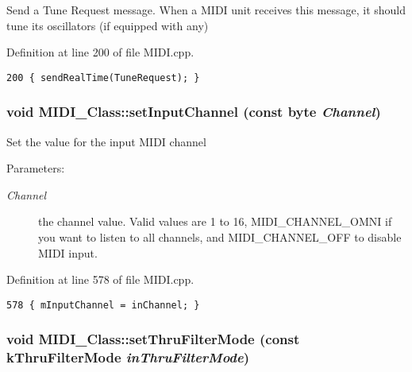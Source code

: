 Send a Tune Request message. When a MIDI unit receives this message, it should tune its oscillators (if equipped with any) 

Definition at line 200 of file MIDI.cpp.

\begin{Code}\begin{verbatim}200 { sendRealTime(TuneRequest); }
\end{verbatim}
\end{Code}


\hypertarget{class_m_i_d_i___class_35a66d47ba598c7ebbee7fbf654dafe8}{
\subsubsection[{setInputChannel}]{\setlength{\rightskip}{0pt plus 5cm}void MIDI\_\-Class::setInputChannel (const {\bf byte} {\em Channel})}}
\label{class_m_i_d_i___class_35a66d47ba598c7ebbee7fbf654dafe8}


Set the value for the input MIDI channel \begin{Desc}
\item[Parameters:]
\begin{description}
\item[{\em Channel}]the channel value. Valid values are 1 to 16, MIDI\_\-CHANNEL\_\-OMNI if you want to listen to all channels, and MIDI\_\-CHANNEL\_\-OFF to disable MIDI input. \end{description}
\end{Desc}


Definition at line 578 of file MIDI.cpp.

\begin{Code}\begin{verbatim}578 { mInputChannel = inChannel; }
\end{verbatim}
\end{Code}


\hypertarget{class_m_i_d_i___class_33d450180a10a36bef08e68015c4d922}{
\subsubsection[{setThruFilterMode}]{\setlength{\rightskip}{0pt plus 5cm}void MIDI\_\-Class::setThruFilterMode (const {\bf kThruFilterMode} {\em inThruFilterMode})}}
\label{class_m_i_d_i___class_33d450180a10a36bef08e68015c4d922}


